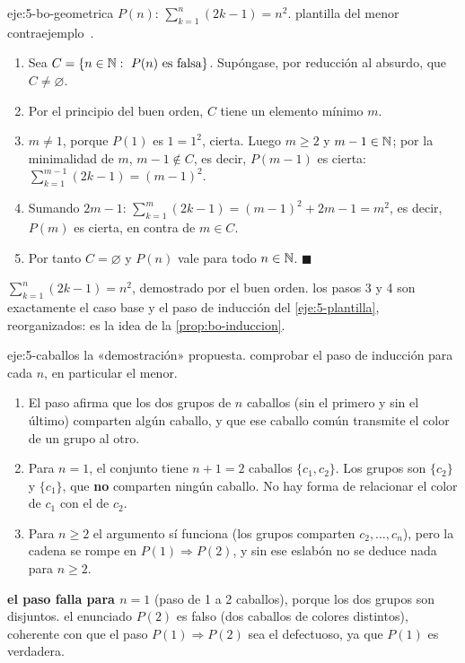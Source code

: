 \begin{solucion}{eje:5-bo-geometrica}
\datos $P(n)$: $\sum_{k=1}^{n}(2k-1)=n^{2}$.
\planteamiento plantilla del menor contraejemplo~\cite[§2.2]{mcs}.
\pasos
\begin{enumerate}[label=\arabic*.]
  \item Sea $C=\{n\in\mathbb{N}:\ P(n)\text{ es falsa}\}$. Supóngase, por reducción al absurdo, que $C\neq\varnothing$.
  \item Por el principio del buen orden, $C$ tiene un elemento mínimo $m$.
  \item $m\neq 1$, porque $P(1)$ es $1=1^{2}$, cierta. Luego $m\ge 2$ y $m-1\in\mathbb{N}$; por la minimalidad de $m$, $m-1\notin C$, es decir, $P(m-1)$ es cierta: $\sum_{k=1}^{m-1}(2k-1)=(m-1)^{2}$.
  \item Sumando $2m-1$: $\sum_{k=1}^{m}(2k-1)=(m-1)^{2}+2m-1=m^{2}$, es decir, $P(m)$ es cierta, en contra de $m\in C$.
  \item Por tanto $C=\varnothing$ y $P(n)$ vale para todo $n\in\mathbb{N}$. $\blacksquare$
\end{enumerate}
\resultado \textbf{$\sum_{k=1}^{n}(2k-1)=n^{2}$}, demostrado por el buen orden.
\comprobacion los pasos 3 y 4 son exactamente el caso base y el paso de inducción del \cref{eje:5-plantilla}, reorganizados: es la idea de la \cref{prop:bo-induccion}.
\end{solucion}

\begin{solucion}{eje:5-caballos}
\datos la «demostración» propuesta.
\planteamiento comprobar el paso de inducción para cada $n$, en particular el menor.
\pasos
\begin{enumerate}[label=\arabic*.]
  \item El paso afirma que los dos grupos de $n$ caballos (sin el primero y sin el último) comparten algún caballo, y que ese caballo común transmite el color de un grupo al otro.
  \item Para $n=1$, el conjunto tiene $n+1=2$ caballos $\{c_1,c_2\}$. Los grupos son $\{c_2\}$ y $\{c_1\}$, que \textbf{no} comparten ningún caballo. No hay forma de relacionar el color de $c_1$ con el de $c_2$.
  \item Para $n\ge 2$ el argumento sí funciona (los grupos comparten $c_2,\dots,c_n$), pero la cadena se rompe en $P(1)\Rightarrow P(2)$, y sin ese eslabón no se deduce nada para $n\ge 2$.
\end{enumerate}
\resultado \textbf{el paso falla para $n=1$} (paso de 1 a 2 caballos), porque los dos grupos son disjuntos.
\comprobacion el enunciado $P(2)$ es falso (dos caballos de colores distintos), coherente con que el paso $P(1)\Rightarrow P(2)$ sea el defectuoso, ya que $P(1)$ es verdadera.
\end{solucion}

